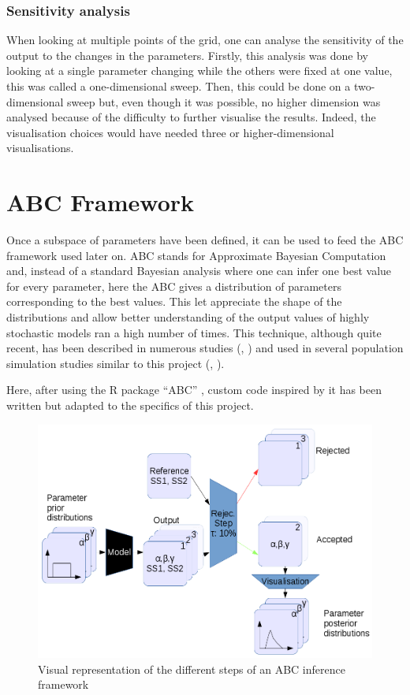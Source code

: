 \documentclass[a4paper,12pt]{report}
\begin{document}
\subsubsection{Sensitivity analysis}
When looking at multiple points of the grid, one can analyse the sensitivity of the output to the changes in the parameters.
Firstly, this analysis was done by looking at a single parameter changing while the others were fixed at one value, this was called a one-dimensional sweep. Then, this could be done on a two-dimensional sweep but, even though it was possible, no higher dimension was analysed because of the difficulty to further visualise the results. Indeed, the visualisation choices would have needed three or higher-dimensional visualisations.


\section{ABC Framework}

Once a subspace of parameters have been defined, it can be used to feed the ABC framework used later on. ABC stands for Approximate Bayesian Computation and, instead of a standard Bayesian analysis where one can infer one best value for every parameter, here the ABC gives a distribution of parameters corresponding to the best values. This let appreciate the shape of the distributions and allow better understanding of the output values of highly stochastic models ran a high number of times. This technique, although quite recent, has been described in numerous studies (\cite{Sun01}, \cite{Csi02}) and used in several population simulation studies similar to this project (\cite{Keh01}, \cite{Gui01}).

Here, after using the R package “ABC” \cite{Csi01}, custom code inspired by it has been written but adapted to the specifics of this project.

\begin{figure}
	\centering
	\includegraphics[scale=0.55]{../data/abc-landscape.png}
	\caption{Visual representation of the different steps of an ABC inference framework}
	\label{abc}
\end{figure}
\end{document}
